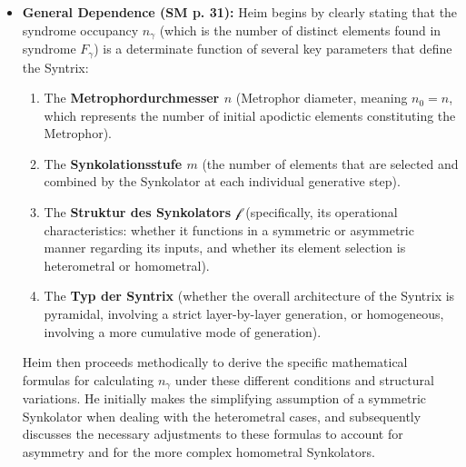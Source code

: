 \documentclass[12pt]{article}
\newcommand{\synkolator}{\mathcal{f}}
\newcommand{\synkolationsstufe}{m}
\newcommand{\syndrom}{F} %
\begin{document}
\begin{itemize}
    \item \textbf{General Dependence (SM p. 31):} Heim begins by clearly stating that the syndrome occupancy \( n_\gamma \) (which is the number of distinct elements found in syndrome \( \syndrom_\gamma \)) is a determinate function of several key parameters that define the Syntrix:
    \begin{enumerate}
        \item The \textbf{Metrophordurchmesser \( n \)} (Metrophor diameter, meaning \( n_0 = n \), which represents the number of initial apodictic elements constituting the Metrophor).
        \item The \textbf{Synkolationsstufe \( \synkolationsstufe \)} (the number of elements that are selected and combined by the Synkolator at each individual generative step).
        \item The \textbf{Struktur des Synkolators \( \synkolator \)} (specifically, its operational characteristics: whether it functions in a symmetric or asymmetric manner regarding its inputs, and whether its element selection is heterometral or homometral).
        \item The \textbf{Typ der Syntrix} (whether the overall architecture of the Syntrix is pyramidal, involving a strict layer-by-layer generation, or homogeneous, involving a more cumulative mode of generation).
    \end{enumerate}

    Heim then proceeds methodically to derive the specific mathematical formulas for calculating \( n_\gamma \) under these different conditions and structural variations. He initially makes the simplifying assumption of a symmetric Synkolator when dealing with the heterometral cases, and subsequently discusses the necessary adjustments to these formulas to account for asymmetry and for the more complex homometral Synkolators.


\end{itemize}
\end{document}
